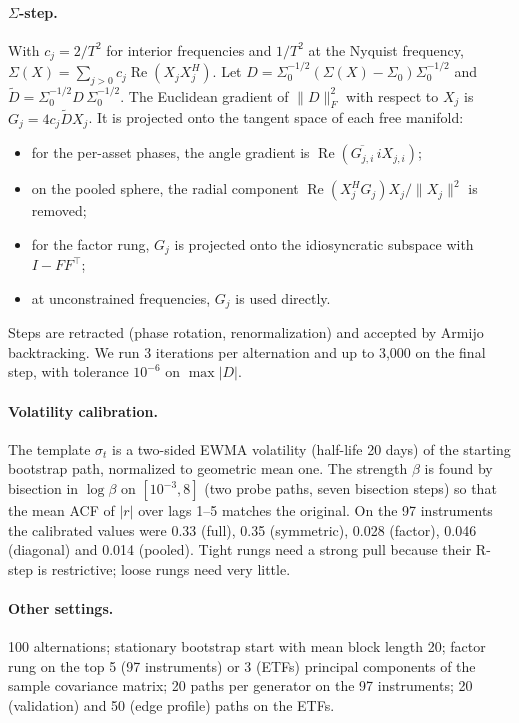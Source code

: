\documentclass[11pt]{article}
\theoremstyle{definition}
\theoremstyle{remark}
\DeclareMathOperator{\Real}{Re}
\begin{document}
\paragraph{$\Sigma$-step.} With $c_j=2/T^2$ for interior frequencies and $1/T^2$ at the Nyquist frequency, $\Sigma(X)=\sum_{j>0}c_j\Real(X_jX_j^H)$. Let
$D=\Sigma_0^{-1/2}(\Sigma(X)-\Sigma_0)\Sigma_0^{-1/2}$ and $\tilde D=\Sigma_0^{-1/2}D\,\Sigma_0^{-1/2}$. The Euclidean gradient of $\|D\|_F^2$ with respect to $X_j$ is
$G_j=4c_j\tilde DX_j$. It is projected onto the tangent space of each free manifold:
\begin{itemize}[leftmargin=*,itemsep=2pt]
\item for the per-asset phases, the angle gradient is $\Real(\overline{G_{j,i}}\,iX_{j,i})$;
\item on the pooled sphere, the radial component $\Real(X_j^HG_j)X_j/\|X_j\|^2$ is removed;
\item for the factor rung, $G_j$ is projected onto the idiosyncratic subspace with $I-FF^\top$;
\item at unconstrained frequencies, $G_j$ is used directly.
\end{itemize}
Steps are retracted (phase rotation, renormalization) and accepted by Armijo backtracking. We run 3 iterations per alternation and up to 3{,}000 on the final step, with
tolerance $10^{-6}$ on $\max|D|$.

\paragraph{Volatility calibration.} The template $\sigma_t$ is a two-sided EWMA volatility (half-life 20 days) of the starting bootstrap path, normalized to geometric
mean one. The strength $\beta$ is found by bisection in $\log\beta$ on $[10^{-3},8]$ (two probe paths, seven bisection steps) so that the mean ACF of $|r|$ over lags 1--5
matches the original. On the 97 instruments the calibrated values were 0.33 (full), 0.35 (symmetric), 0.028 (factor), 0.046 (diagonal) and 0.014 (pooled). Tight rungs need
a strong pull because their R-step is restrictive; loose rungs need very little.

\paragraph{Other settings.} 100 alternations; stationary bootstrap start with mean block length 20; factor rung on the top 5 (97 instruments) or 3 (ETFs) principal
components of the sample covariance matrix; 20 paths per generator on the 97 instruments; 20 (validation) and 50 (edge profile) paths on the ETFs.
\end{document}
